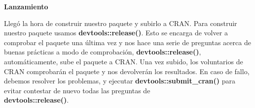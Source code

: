 \textbf{Lanzamiento}

Lleg\'o la hora de construir nuestro paquete y subirlo a CRAN. Para construir nuestro paquete
usamos \textbf{devtools::release()}. Esto se encarga de volver a comprobar el paquete una \'ultima
vez y nos hace una serie de preguntas acerca de buenas pr\'acticas a modo de comprobaci\'on,
\textbf{devtools::release()}, autom\'aticamente, sube el paquete a CRAN.
Una vez subido, los voluntarios de CRAN comprobar\'an el paquete y nos
devolver\'an los resultados.
En caso de fallo, debemos resolver los problemas, y ejecutar \textbf{devtools::submit\_cran()} para evitar contestar de nuevo todas las preguntas de \\
\textbf{devtools::release()}.

\newpage